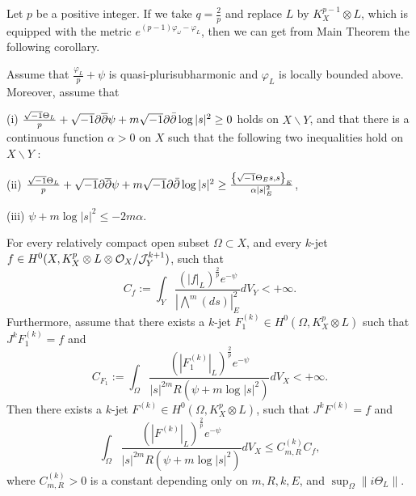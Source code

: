 \documentclass[lang=en,12pt,twoside]{textbook}
\begin{document}
Let $p$ be a positive integer. If we take $q=\frac{2}{p}$ and replace $L$ by $K_X^{p-1}\otimes L$, which is equipped with the metric $e^{(p-1)\varphi_\omega-\varphi_L}$, then we can get from Main Theorem the following corollary.

\begin{corollary}\label{cor:1}
  Assume that $\frac{\varphi_L}{p}+\psi$ is quasi-plurisubharmonic and $\varphi_L$ is locally bounded above. Moreover, assume that\vspace{.25em}

  {\upshape (i)}\vspace{.25em} \quad $\frac{\sqrt{-1} \Theta_L}{p}+\sqrt{-1}\partial\overline{\partial}\psi+m\sqrt{-1} \partial \bar{\partial} \log |s|^2 \geq 0$ holds on $X \backslash Y$,\newline
  and that there is a continuous function $\alpha>0$ on $X$ such that the following two inequalities hold on $X \backslash Y$ :

  {\upshape (ii)} \quad $\frac{\sqrt{-1} \Theta_L}{p}+\sqrt{-1}\partial\overline{\partial}\psi+m\sqrt{-1} \partial \bar{\partial} \log |s|^2\geq \frac{\left\{\sqrt{-1} \Theta_E s, s\right\}_E}{\alpha|s|_E^2}$,

  {\upshape (iii)} \quad $\psi+m\log |s|^2 \leq-2 m \alpha$.
  
For every relatively compact open subset $\Omega\subset X$, and every  $k$-jet  $f\in H^0 (X,K_X^p\otimes L\otimes {\mathcal O}_X/{\mathcal J}_Y^{k+1})$, such that
  $$
  C_f:=\int_Y \frac{\left(|f|_L\right)^{\frac{2}{p}} e^{-\psi}}{\left|\bigwedge^m(d s)\right|_E^2} d V_Y<+\infty .
  $$
  Furthermore, assume that there exists a $k$-jet  $F_1^{(k)}\in H^0(\Omega,K_X^p\otimes L)$  such that $J^k F_1^{(k)}=f$ and
  $$
  C_{F_1}:=\int_\Omega \frac{\left(\left|F_1^{(k)}\right|_L\right)^{\frac{2}{p}} e^{-\psi}}{|s|^{2m} R(\psi+m\log |s|^2)} d V_X<+\infty.
  $$
  Then there exists a $k$-jet  $F^{(k)}\in H^0(\Omega,K_X^p\otimes L)$, such that $J^k F^{(k)}=f$ and
$$
\int_\Omega \frac{\left(|F^{(k)}|_L\right)^{\frac{2}{p}} e^{-\psi}}{|s|^{2m} R(\psi+m\log |s|^2)} d V_X \leq C_{m,R}^{(k)}  C_f ,
$$
where $C_{m,R}^{(k)}>0$ is a constant depending only on $m,R,k, E$, and $\sup _{\Omega}\|i \Theta_L\|$.
\end{corollary}
\end{document}
